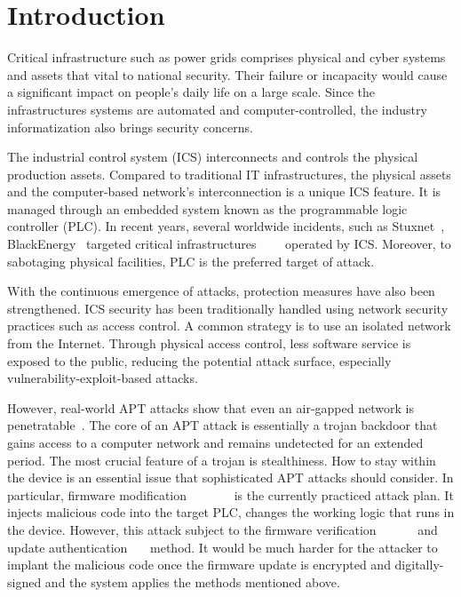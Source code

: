 \section{Introduction}
\label{sec:implant-introduction}

Critical infrastructure such as power grids comprises physical and cyber systems and assets that vital to national security. Their failure or incapacity would cause a significant impact on people's daily life on a large scale. Since the infrastructures systems are automated and computer-controlled, the industry informatization also brings security concerns. 

The industrial control system (ICS) interconnects and controls the physical production assets.  Compared to traditional IT infrastructures, the physical assets and the computer-based network's interconnection is a unique ICS feature. It is managed through an embedded system known as the programmable logic controller (PLC). In recent years, several worldwide incidents, such as Stuxnet~\cite{langner2011stuxnet}, BlackEnergy~\cite{cherepanov2016blackenergy} targeted critical infrastructures~\cite{case2016analysis}~\cite{soltan2016power}~\cite{zhang2013time}~\cite{williams2016power} operated by ICS. Moreover, to sabotaging physical facilities, PLC is the preferred target of attack.

With the continuous emergence of attacks, protection measures have also been strengthened. ICS security has been traditionally handled using network security practices such as access control. A common strategy is to use an isolated network from the Internet. Through physical access control, less software service is exposed to the public, reducing the potential attack surface, especially vulnerability-exploit-based attacks. 

However, real-world APT attacks show that even an air-gapped network is penetratable~\cite{langner2011stuxnet}. The core of an APT attack is essentially a trojan backdoor that gains access to a computer network and remains undetected for an extended period. The most crucial feature of a trojan is stealthiness. How to stay within the device is an essential issue that sophisticated APT attacks should consider. In particular, firmware modification~\cite{garcia2017hey}~\cite{newman2011scada}~\cite{basnight2013firmware}~\cite{blanco2012one}~\cite{cui2013firmware}~\cite{konstantinou2015impact}~\cite{schulz2017nexmon} is the currently practiced attack plan. It injects malicious code into the target PLC, changes the working logic that runs in the device. However, this attack subject to the firmware verification~\cite{mcminn2012firmware}~\cite{wang2015confirm}~\cite{lee2016binding}~\cite{li2011viper}~\cite{seshadri2004swatt}~\cite{li2010sbap} and update authentication~\cite{lee2017blockchain}~\cite{moran2019firmware}~\cite{choi2016secure} method. It would be much harder for the attacker to implant the malicious code once the firmware update is encrypted and digitally-signed and the system applies the methods mentioned above.


